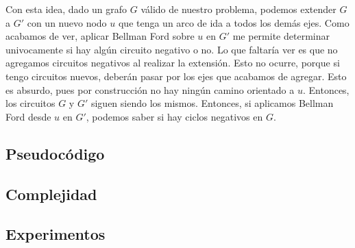 Con esta idea, dado un grafo  $G$ válido de nuestro problema, podemos extender $G$ a $G'$ con un nuevo nodo $u$ que tenga un arco de ida a todos los demás ejes. Como acabamos de ver, aplicar Bellman Ford sobre $u$ en $G'$ me permite determinar univocamente si hay algún circuito negativo o no. Lo que faltaría ver es que no agregamos circuitos negativos al realizar la extensión. Esto no ocurre, porque si tengo circuitos nuevos, deberán pasar por los ejes que acabamos de agregar. Esto es absurdo, pues por construcción no hay ningún camino orientado a $u$. Entonces, los circuitos $G$ y $G'$ siguen siendo los mismos. Entonces, si aplicamos Bellman Ford desde $u$ en $G'$, podemos saber si hay ciclos negativos en $G$. \\



\subsection{Pseudocódigo}

\subsection{Complejidad}

\subsection{Experimentos}